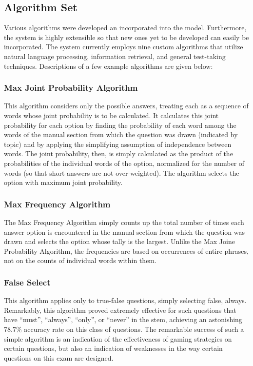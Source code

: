 \subsection{Algorithm Set}

Various algorithms were developed an incorporated into the model.  Furthermore, the system is highly extensible so that new ones yet to be developed can easily be incorporated.  The system currently employs nine custom algorithms that utilize natural language processing, information retrieval, and general test-taking techniques.  Descriptions of a few example algorithms are given below:

\subsubsection{Max Joint Probability Algorithm}

This algorithm considers only the possible answers, treating each as a sequence of words whose joint probability is to be calculated.  It calculates this joint probability for each option by finding the probability of each word among the words of the manual section from which the question was drawn (indicated by topic) and by applying the simplifying assumption of independence between words.  The joint probability, then, is simply calculated as the product of the probabilities of the individual words of the option, normalized for the number of words (so that short answers are not over-weighted).  The algorithm selects the option with maximum joint probability.

\subsubsection{Max Frequency Algorithm}

The Max Frequency Algorithm simply counts up the total number of times each answer option is encountered in the manual section from which the question was drawn and selects the option whose tally is the largest.  Unlike the Max Joine Probability Algorithm, the frequencies are based on occurrences of entire phrases, not on the counts of individual words within them.

\subsubsection{False Select}

This algorithm applies only to true-false questions, simply selecting false, always.  Remarkably, this algorithm proved extremely effective for such questions that have ``must'', ``always'', ``only'', or ``never'' in the stem, achieving an astonishing 78.7\% accuracy rate on this class of questions.  The remarkable success of such a simple algorithm is an indication of the effectiveness of gaming strategies on certain questions, but also an indication of weaknesses in the way certain questions on this exam are designed.

